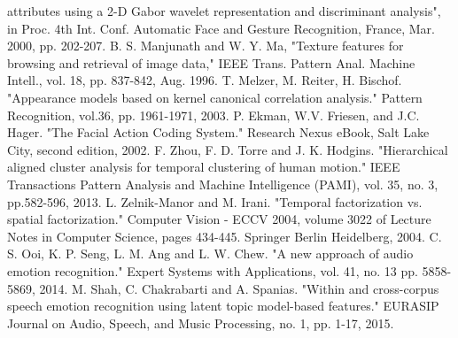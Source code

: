 \documentclass[10pt,journal,compsoc]{IEEEtran}
\begin{document}
\begin{thebibliography}{1}
attributes using a 2-D Gabor wavelet representation and discriminant analysis",
in Proc. 4th Int. Conf. Automatic Face and Gesture Recognition,
France, Mar. 2000, pp. 202-207.
B. S. Manjunath and W. Y. Ma, "Texture features for browsing and
retrieval of image data," IEEE Trans. Pattern Anal. Machine Intell., vol.
18, pp. 837-842, Aug. 1996.
T. Melzer, M. Reiter, H. Bischof. "Appearance models based on kernel canonical
correlation analysis." Pattern Recognition, vol.36, pp. 1961-1971, 2003.
P. Ekman, W.V. Friesen, and J.C. Hager. "The Facial Action Coding System." Research
Nexus eBook, Salt Lake City, second edition, 2002.
F. Zhou, F. D. Torre and J. K. Hodgins. "Hierarchical aligned
cluster analysis for temporal clustering of human motion." IEEE Transactions Pattern
Analysis and Machine Intelligence (PAMI), vol. 35, no. 3, pp.582-596, 2013.
L. Zelnik-Manor and M. Irani. "Temporal factorization vs. spatial factorization." Computer Vision - ECCV 2004, volume 3022
of Lecture Notes in Computer Science, pages 434-445. Springer Berlin Heidelberg, 2004.
C. S. Ooi, K. P. Seng, L. M. Ang and L. W. Chew. "A new approach of audio emotion recognition." Expert Systems with Applications, vol. 41, no. 13 pp. 5858-5869, 2014.
M. Shah, C. Chakrabarti and A. Spanias. "Within and cross-corpus speech emotion recognition using latent topic model-based features." EURASIP Journal on Audio, Speech, and Music Processing, no. 1, pp. 1-17, 2015.


\end{thebibliography}


%

\end{document}
